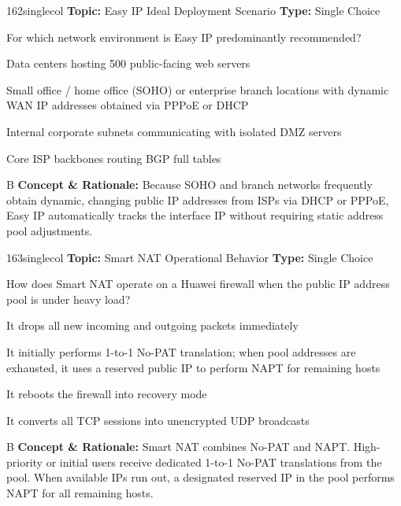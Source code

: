 \begin{qcard}{162}{singlecol}
\textcolor{darkslate!75}{\small\textbf{Topic:} Easy IP Ideal Deployment Scenario \hfill \textbf{Type:} Single Choice}\vspace{0.4em}\par
For which network environment is Easy IP predominantly recommended?
\begin{qoptions}
\item Data centers hosting 500 public-facing web servers
\item Small office / home office (SOHO) or enterprise branch locations with dynamic WAN IP addresses obtained via PPPoE or DHCP
\item Internal corporate subnets communicating with isolated DMZ servers
\item Core ISP backbones routing BGP full tables
\end{qoptions}
\end{qcard}
\nopagebreak
\begin{explainbox}{B}
\textbf{Concept \& Rationale:} Because SOHO and branch networks frequently obtain dynamic, changing public IP addresses from ISPs via DHCP or PPPoE, Easy IP automatically tracks the interface IP without requiring static address pool adjustments.
\end{explainbox}

\begin{qcard}{163}{singlecol}
\textcolor{darkslate!75}{\small\textbf{Topic:} Smart NAT Operational Behavior \hfill \textbf{Type:} Single Choice}\vspace{0.4em}\par
How does Smart NAT operate on a Huawei firewall when the public IP address pool is under heavy load?
\begin{qoptions}
\item It drops all new incoming and outgoing packets immediately
\item It initially performs 1-to-1 No-PAT translation; when pool addresses are exhausted, it uses a reserved public IP to perform NAPT for remaining hosts
\item It reboots the firewall into recovery mode
\item It converts all TCP sessions into unencrypted UDP broadcasts
\end{qoptions}
\end{qcard}
\nopagebreak
\begin{explainbox}{B}
\textbf{Concept \& Rationale:} Smart NAT combines No-PAT and NAPT. High-priority or initial users receive dedicated 1-to-1 No-PAT translations from the pool. When available IPs run out, a designated reserved IP in the pool performs NAPT for all remaining hosts.
\end{explainbox}

